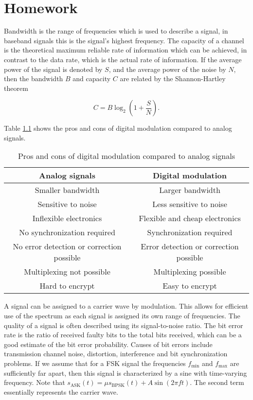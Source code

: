 \documentclass[11pt,titlepage]{report}
\begin{document}
\chapter{Homework}
Bandwidth is the range of frequencies which is used to describe a signal, in baseband signals this is the signal's highest frequency. The capacity of a channel is the  theoretical maximum reliable rate of information which can be achieved, in contrast to the data rate, which is the actual rate of information. If the average power of the signal is denoted by $S$, and the average power of the noise by $N$, then the bandwidth $B$ and capacity $C$ are related by the Shannon-Hartley theorem

\begin{equation}
	C=B \log_2{\left(1+\frac{S}{N}\right)}.
\end{equation}

Table \ref{tab:pros-cons} shows the pros and cons of digital modulation compared to analog signals.

\begin{table}[H]
	\centering
	\caption{Pros and cons of digital modulation compared to analog signals}
	\label{tab:pros-cons}
	\begin{tabular}{c c}
		\hline\hline
		Analog signals & Digital modulation \\
		\hline
		Smaller bandwidth & Larger bandwidth \\
		Sensitive to noise & Less sensitive to noise \\
		Inflexible electronics & Flexible and cheap electronics \\
		No synchronization required & Synchronization required \\
		No error detection or correction possible & Error detection or correction possible \\
		Multiplexing not possible & Multiplexing possible \\
		Hard to encrypt & Easy to encrypt \\
		\hline
	\end{tabular}
\end{table}

A signal can be assigned to a carrier wave by modulation. This allows for efficient use of the spectrum as each signal is assigned its own range of frequencies. The quality of a signal is often described using its signal-to-noise ratio. The bit error rate is the ratio of received faulty bits to the total bits received, which can be a good estimate of the bit error probability. Causes of bit errors include transmission channel noise, distortion, interference and bit synchronization problems. If we assume that for a FSK signal the frequencies $f_{\text{min}}$ and $f_{\text{max}}$ are sufficiently far apart, then this signal is characterized by a sine with time-varying frequency. Note that $s_{\text{ASK}}(t) = \mu s_{\text{BPSK}}(t) + A \sin{(2 \pi f t)}$. The second term essentially represents the carrier wave.
\end{document}
